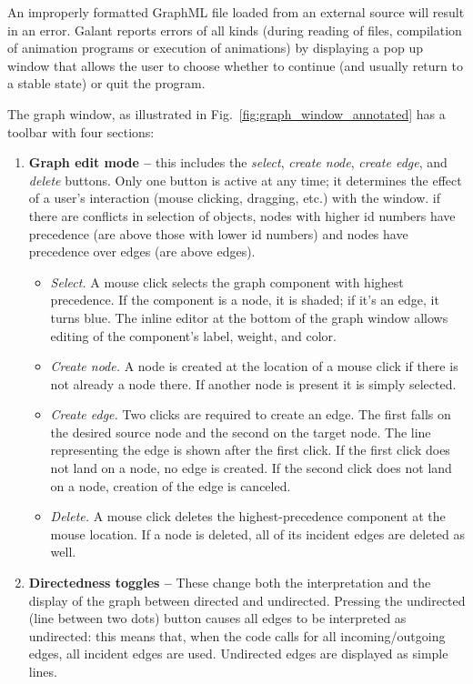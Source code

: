 An improperly formatted GraphML file loaded from an external source will
result in an error.
Galant reports errors of all kinds (during reading of files, compilation of
animation programs or execution of animations)
by displaying a pop up window that allows the user to choose whether to
continue (and usually return to a stable state) or quit the program.

The graph window, as illustrated in Fig.~\ref{fig:graph_window_annotated}
has a toolbar with four sections:
\begin{enumerate}
\item
\textbf{Graph edit mode -- }
this includes the \emph{select}, \emph{create node}, \emph{create edge}, and \emph{delete} buttons.
Only one button is active at any time; it determines the effect
of a user's interaction (mouse clicking, dragging, etc.) with the window.
if there are conflicts in selection of objects, nodes with higher id numbers have precedence (are above those with lower id numbers) and nodes
have precedence over edges (are above edges).
\begin{itemize}
\item \emph{Select.} A mouse click selects the graph component with highest precedence.
If the component is a node, it is shaded; if it's an edge, it turns blue.
The inline editor at the bottom of the graph window allows editing of the
component's label, weight, and color.
\item \emph{Create node.}
A node is created at the location of a mouse click if there is not already a node there.
If another node is present it is simply selected.
\item \emph{Create edge.}
Two clicks are required to create an edge. The first falls on the desired
source node and the second on the target node.
The line representing the edge is shown after the first click.
If the first click does not land on a node, no edge is created.
If the second click does not land on a node, creation of the edge is canceled.
\item \emph{Delete.}
A mouse click deletes the highest-precedence component at the mouse location.
If a node is deleted, all of its incident edges are deleted as well.
\end{itemize}

\item
\textbf{Directedness toggles --}
These change both the interpretation and the
display of the graph between directed and undirected.
Pressing the undirected (line between two dots) button causes
all edges to be interpreted as undirected: this means that, when the code
calls for all incoming/outgoing edges, all incident edges are used.
Undirected edges are displayed as simple lines.


\end{enumerate}
